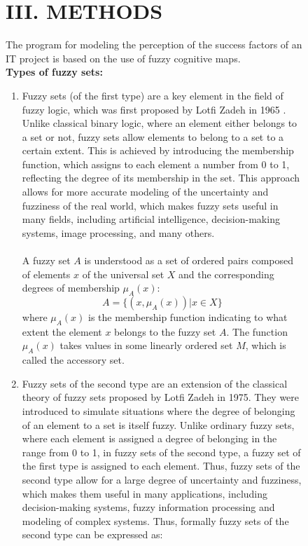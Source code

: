 \documentclass{article}
\begin{document}
\begin{figure}[!t]
\begin{minipage}{0.49\textwidth}
\begin{center}
                \chapter{III. METHODS}
            \end{center}
            The program for modeling the perception of the success factors of an IT project is based on the use of fuzzy cognitive maps.\\
            \textbf{Types of fuzzy sets:}
            \begin{enumerate}
                \item Fuzzy sets (of the first type) are a key element in the field of fuzzy logic, which was first proposed by Lotfi Zadeh in 1965 \cite{litlink21}. Unlike classical binary logic, where an element either belongs to a set or not, fuzzy sets allow elements to belong to a set to a certain extent. This is achieved by introducing the membership function, which assigns to each element a number from 0 to 1, reflecting the degree of its membership in the set. This approach allows for more accurate modeling of the uncertainty and fuzziness of the real world, which makes fuzzy sets useful in many fields, including artificial intelligence, decision-making systems, image processing, and many others.\\
                ~\\
                A fuzzy set $A$ is understood as a set of ordered pairs composed of elements $x$ of the universal set $X$ and the corresponding degrees of membership $\mu_A(x)$:\\
                $$A=\{(x, \mu_A(x)) | x \in X\}$$
                where $\mu_A(x)$ is the membership function indicating to what extent the element $x$ belongs to the fuzzy set $A$. The function $\mu_A(x)$ takes values in some linearly ordered set $M$, which is called the accessory set.
                \item Fuzzy sets of the second type are an extension of the classical theory of fuzzy sets proposed by Lotfi Zadeh in 1975. They were introduced to simulate situations where the degree of belonging of an element to a set is itself fuzzy. Unlike ordinary fuzzy sets, where each element is assigned a degree of belonging in the range from 0 to 1, in fuzzy sets of the second type, a fuzzy set of the first type is assigned to each element. Thus, fuzzy sets of the second type allow for a large degree of uncertainty and fuzziness, which makes them useful in many applications, including decision-making systems, fuzzy information processing and modeling of complex systems. Thus, formally fuzzy sets of the second type can be expressed as:

\end{enumerate}
\end{minipage}
\end{figure}
\end{document}
